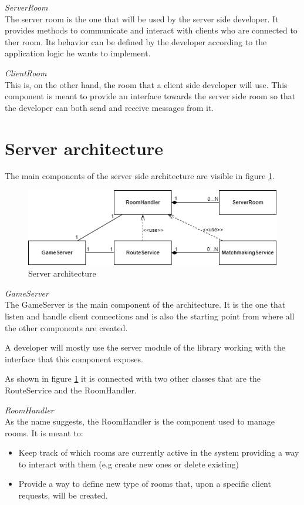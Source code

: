 \bigskip
\textit{ServerRoom}
\\
The server room is the one that will be used by the server side developer. It provides methods to communicate and interact with clients who are connected to ther room. Its behavior can be defined by the developer according to the application logic he wants to implement.

\bigskip
\textit{ClientRoom}
\\
This is, on the other hand, the room that a client side developer will use. This component is meant to provide an interface towards the server side room so that the developer can both send and receive messages from it.

\section{Server architecture} \label{sec:server_arch}
The main components of the server side architecture are visible in figure \ref{fig:server_classes}. 

\begin{figure}[H]
	\centering
	\includegraphics[scale=0.7]{images/3-architecture/server-architecture.png}
	\caption{Server architecture}
	\label{fig:server_classes}
\end{figure}

\bigskip
\textit{GameServer}
\\
The GameServer is the main component of the architecture. It is the one that listen and handle client connections and is also the starting point from where all the other components are created.

A developer will mostly use the server module of the library working with the interface that this component exposes.

As shown in figure \ref{fig:server_classes} it is connected with two other classes that are the RouteService and the RoomHandler.

\bigskip
\textit{RoomHandler}
\\
As the name suggests, the RoomHandler is the component used to manage rooms. It is meant to: 
\begin{itemize}
	\item Keep track of which rooms are currently active in the system providing a way to interact with them (e.g create new ones or delete existing)
	\item Provide a way to define new type of rooms that, upon a specific client requests, will be created.
\end{itemize}

